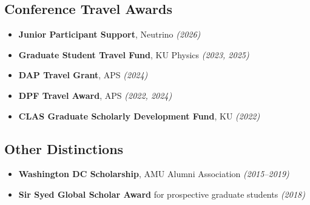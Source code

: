 \documentclass[10pt]{report}
\begin{document}
\subsection*{Conference Travel Awards}
\begin{itemize}
    \item {\bf Junior Participant Support}, Neutrino \textit{(2026)}
    \item \textbf{Graduate Student Travel Fund}, KU Physics \textit{(2023, 2025)}
    \item \textbf{DAP Travel Grant}, APS \textit{(2024)}
    \item \textbf{DPF Travel Award}, APS \textit{(2022, 2024)}
    \item \textbf{CLAS Graduate Scholarly Development Fund}, KU \textit{(2022)}
\end{itemize}

\subsection*{Other Distinctions}
\begin{itemize}
    \item \textbf{Washington DC Scholarship}, AMU Alumni Association \textit{(2015--2019)}
    \item \textbf{Sir Syed Global Scholar Award} for prospective graduate students \textit{(2018)}
\end{itemize}

\end{document}
